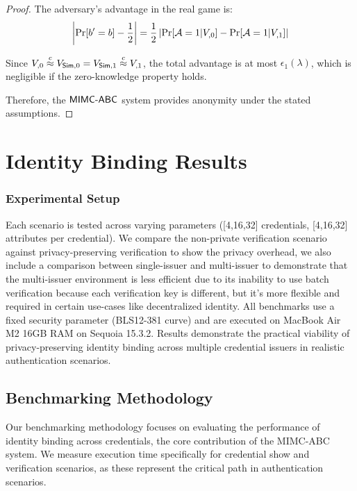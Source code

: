 \begin{proof}
    The adversary's advantage in the real game is:
    \[
    \left|\Pr[b' = b] - \frac{1}{2}\right| = \frac{1}{2} \left|\Pr[\Adv = 1 | V_{\real,0}] - \Pr[\Adv = 1 | V_{\real,1}]\right|
    \]
    
    Since $V_{\real,0} \stackrel{c}{\approx} V_{\Sim,0} = V_{\Sim,1} \stackrel{c}{\approx} V_{\real,1}$, the total advantage is at most $\epsilon_1(\lambda)$, which is negligible if the zero-knowledge property holds.
    
    Therefore, the $\mathsf{MIMC\text{-}ABC}$ system provides anonymity under the stated assumptions.
\end{proof}


\newpage





\section{Identity Binding Results}

\subsubsection*{Experimental Setup}
Each scenario is tested across varying parameters ([4,16,32] credentials, [4,16,32] attributes per credential). We compare the non-private verification scenario against privacy-preserving verification to show the privacy overhead, we also include a comparison between single-issuer and multi-issuer to demonstrate that the multi-issuer environment is less efficient due to its inability to use batch verification because each verification key is different, but it's more flexible and required in certain use-cases like decentralized identity. All benchmarks use a fixed security parameter (BLS12-381 curve) and are executed on MacBook Air M2 16GB RAM on Sequoia 15.3.2. Results demonstrate the practical viability of privacy-preserving identity binding across multiple credential issuers in realistic authentication scenarios.

\subsection{Benchmarking Methodology}

Our benchmarking methodology focuses on evaluating the performance of identity binding across credentials, the core contribution of the MIMC-ABC system. We measure execution time specifically for credential show and verification scenarios, as these represent the critical path in authentication scenarios.


